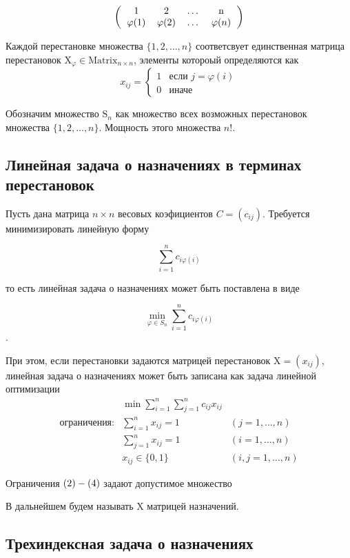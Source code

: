 \[
\left (
  \begin{tabular}{cccc}
  1 & 2 & \ldots & n\\
  $\varphi (1)$ & $\varphi (2)$ & \ldots & $\varphi (n)$
  \end{tabular}
\right )
\]

Каждой перестановке множества $\{1, 2, \ldots , n \}$ соответсвует единственная матрица
перестановок $\mathrm{X}_\varphi \in \mathrm{Matrix}_{n \times n}$, элементы котороый определяются как
\[
x_{ij} =
 \begin{cases}
   1 & \text{если } j = \varphi(i) \\
   0 & \text{иначе}
 \end{cases}
\]

Обозначим множество $\mathrm{S}_n$ как множество всех возможных перестановок множества
 $\{1, 2, \ldots , n \}$. Мощность этого множества $n!$.

\subsection{Линейная задача о назначениях в терминах перестановок}
Пусть дана матрица $n \times n$ весовых коэфициентов $C = (c_{ij})$.
Требуется минимизировать линейную форму

\[
  \sum^n_{i = 1} c_{i \varphi (i)}
\]

то есть линейная задача о назначениях может быть поставлена в виде

\[
  \min_{\varphi \in S_n} \sum^n_{i = 1} c_{i \varphi (i)}
\].

При этом, если перестановки задаются матрицей перестановок $\mathrm{X} = (x_{ij})$,
линейная задача о назначениях может быть записана как задача линейной оптимизации
\begin{align}
  & \min \displaystyle \sum^n_{i = 1} \displaystyle \sum^n_{j = 1} c_{ij} x_{ij} \\
  \text{ограничения:} & \displaystyle \sum^n_{i = 1} x_{ij} = 1 &(j = 1, \ldots, n) \\
  &\displaystyle \sum^n_{j = 1} x_{ij} = 1 &(i = 1, \ldots, n) \\
  & x_{ij} \in \{ 0, 1 \}
  &(i,j = 1, \ldots, n)
\end{align}

Ограничения  $(2) \-- (4)$ задают допустимое множество

В дальнейшем будем называть $\mathrm{X}$ матрицей назначений.

\subsection{Трехиндексная задача о назначениях}


